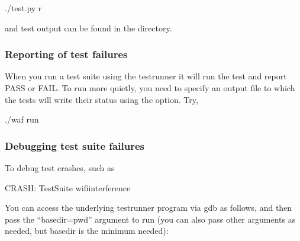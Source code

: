 \documentclass[letterpaper,10pt,english]{sphinxmanual}
\renewcommand{\sphinxcode}[1]{\texttt{\small{#1}}}
\begin{document}
\begin{sphinxVerbatim}[commandchars=\\\{\}]
\PYGZdl{} ./test.py \PYGZhy{}r
\end{sphinxVerbatim}

and test output can be found in the \sphinxcode{} directory.


\subsubsection{Reporting of test failures}
\label{\detokenize{test-framework:reporting-of-test-failures}}
When you run a test suite using the test\sphinxhyphen{}runner it will run the test
and report PASS or FAIL.
To run more quietly, you need to specify an output file to which the tests will write their status using the \sphinxcode{} option.
Try,

\begin{sphinxVerbatim}[commandchars=\\\{\}]
\PYGZdl{} ./waf \PYGZhy{}\PYGZhy{}run 
\end{sphinxVerbatim}


\subsubsection{Debugging test suite failures}
\label{\detokenize{test-framework:debugging-test-suite-failures}}
To debug test crashes, such as

\begin{sphinxVerbatim}[commandchars=\\\{\}]
CRASH: TestSuite wifi\PYGZhy{}interference
\end{sphinxVerbatim}

You can access the underlying test\sphinxhyphen{}runner program via gdb as follows, and
then pass the “\textendash{}basedir=\textasciigrave{}pwd\textasciigrave{}” argument to run (you can also pass other
arguments as needed, but basedir is the minimum needed):
\end{document}
